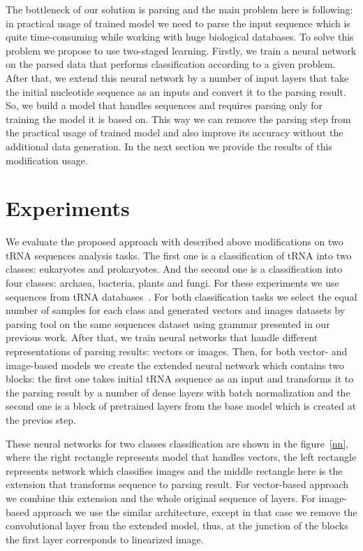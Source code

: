 \documentclass[12pt,a4paper]{cibb}
\begin{document}
The bottleneck of our solution is parsing and the main problem here is following: in practical usage of trained model we need to parse the input sequence which is quite time-consuming while working with huge biological databases.
To solve this problem we propose to use two-staged learning.
Firstly, we train a neural network on the parsed data that performs classification according to a given problem.
After that, we extend this neural network by a number of input layers that take the initial nucleotide sequence as an inputs and convert it to the parsing result.
So, we build a model that handles sequences and requires parsing only for training the model it is based on.
This way we can remove the parsing step from the practical usage of trained model and also improve its accuracy without the additional data generation.
In the next section we provide the results of this modification usage.


\section{\bf Experiments}

We evaluate the proposed approach with described above modifications on two tRNA sequences analysis tasks.
The first one is a classification of tRNA into two classes: eukaryotes and prokaryotes.
And the second one is a classification into four classes: archaea, bacteria, plants and fungi.
For these experiments we use sequences from tRNA databases~\cite{trnadb1,trnadb2}.
For both classification tasks we select the equal number of samples for each class and generated vectors and images datasets by parsing tool on the same sequences dataset using grammar presented in our previous work.
After that, we train neural networks that handle different representations of parsing results: vectors or images.
Then, for both vector- and image-based models we create the extended neural network which contains two blocks: the first one takes initial tRNA sequence as an input and transforms it to the parsing result by a number of dense layers with batch normalization and the second one is a block of pretrained layers from the base model which is created at the previos step.

These neural networks for two classes classification are shown in the figure~\ref{nn}, where the right rectangle represents model that handles vectors, the left rectangle represents network which classifies images and the middle rectangle here is the extension that transforms sequence to parsing result. For vector-based approach we combine this extension and the whole original sequence of layers.
For image-based approach we use the similar architecture, except in that case we remove the convolutional layer from the extended model, thus, at the junction of the blocks the first layer corresponds to linearized image.
\end{document}
